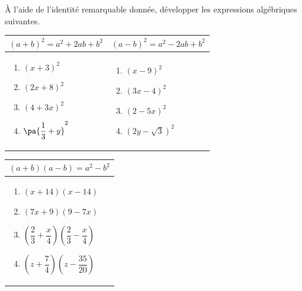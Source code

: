 \begin{exo}
	À l'aide de l'identité remarquable donnée, développer les expressions algébriques suivantes.

	\def\arraystretch{1.5}
	\begin{tabular}{m{3.5cm}|m{3.5cm}}
		$(a + b)^2 = a^2 + 2ab + b^2$ & $(a - b)^2 = a^2 - 2ab + b^2$ \\ \hline
		\begin{enumerate}[label=\alph*)]
			\item $(x + 3)^2$
			\item $(2x + 8)^2$
			\item $(4 + 3x)^2$
			\item $\pa{\dfrac{1}{3} + y}^2$
		\end{enumerate}
		                              &
		\begin{enumerate}[label=\alph*)]
			\item $(x - 9)^2$
			\item $(3x - 4)^2$
			\item $(2 - 5x)^2$
			\item $(2y - \sqrt{3})^2$
		\end{enumerate}
	\end{tabular}
	\begin{center}
		\begin{tabular}{m{3.8cm}}
			$(a + b)(a - b) = a^2 - b^2$ \\ \hline
			\begin{enumerate}[label=\alph*)]
				\item $(x + 14)(x - 14)$
				\item $(7x + 9)(9 - 7x)$
				\item $\left( \dfrac{2}{3} + \dfrac{x}{4} \right)\left( \dfrac{2}{3} - \dfrac{x}{4} \right)$
				\item $\left( z + \dfrac{7}{4} \right)\left( z - \dfrac{35}{20} \right)$
			\end{enumerate}
		\end{tabular}
	\end{center}
\end{exo}
